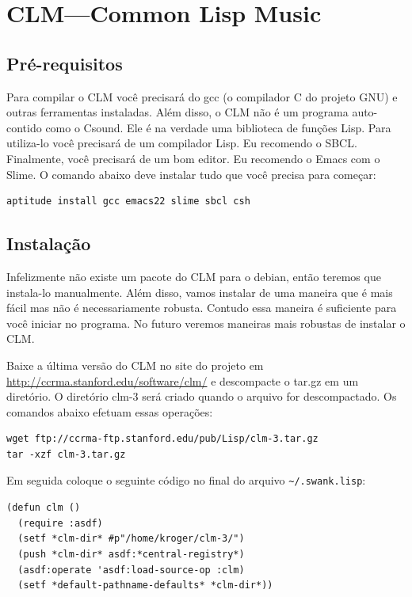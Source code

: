 \documentclass[12pt,brazil]{book}
\begin{document}
\chapter{CLM---Common Lisp Music}
\label{cha:clm-common-lisp}

\section{Pré-requisitos}
\label{sec:pre-requisitos}

Para compilar o CLM você precisará do gcc (o compilador C do projeto
GNU) e outras ferramentas instaladas. Além disso, o CLM não é um
programa auto-contido como o Csound. Ele é na verdade uma biblioteca
de funções Lisp. Para utiliza-lo você precisará de um compilador Lisp.
Eu recomendo o SBCL. Finalmente, você precisará de um bom editor. Eu
recomendo o Emacs com o Slime. O comando abaixo deve instalar tudo que
você precisa para começar:

\begin{verbatim}
aptitude install gcc emacs22 slime sbcl csh
\end{verbatim}

\section{Instalação}
\label{sec:instalacao}

Infelizmente não existe um pacote do CLM para o debian, então teremos
que instala-lo manualmente. Além disso, vamos instalar de uma maneira
que é mais fácil mas não é necessariamente robusta. Contudo essa
maneira é suficiente para você iniciar no programa. No futuro veremos
maneiras mais robustas de instalar o CLM.

Baixe a última versão do CLM no site do projeto em
\url{http://ccrma.stanford.edu/software/clm/} e descompacte o tar.gz
em um diretório. O diretório clm-3 será criado quando o arquivo for
descompactado. Os comandos abaixo efetuam essas operações:

\begin{verbatim}
wget ftp://ccrma-ftp.stanford.edu/pub/Lisp/clm-3.tar.gz
tar -xzf clm-3.tar.gz
\end{verbatim}

Em seguida coloque o seguinte código no final do arquivo
\verb|~/.swank.lisp|:

\begin{verbatim}
(defun clm ()
  (require :asdf)
  (setf *clm-dir* #p"/home/kroger/clm-3/")
  (push *clm-dir* asdf:*central-registry*)
  (asdf:operate 'asdf:load-source-op :clm)
  (setf *default-pathname-defaults* *clm-dir*))
\end{verbatim}
\end{document}

